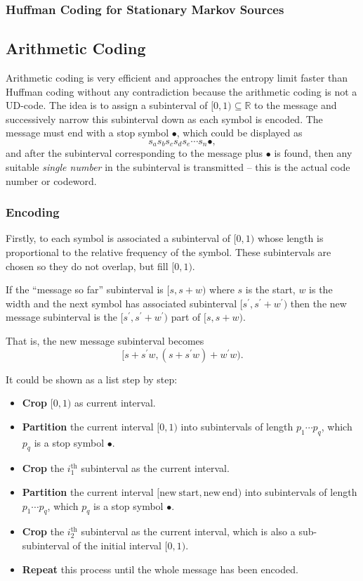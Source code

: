 \documentclass{article}
\begin{document}
\subsubsection{Huffman Coding for Stationary Markov Sources}

\subsection{Arithmetic Coding}

Arithmetic coding is very efficient and approaches the entropy limit faster than Huffman coding without any contradiction because the arithmetic coding is not a UD-code. The idea is to assign a subinterval of $[0, 1) \subseteq \mathbb{R}$ to the message and successively narrow this subinterval down as each symbol is encoded. The message must end with a stop symbol $\bullet$, which could be displayed as 
    \[s_{a}s_{b}s_{c}s_{d}s_{e} \cdots s_{n} \bullet,\]
    and after the subinterval corresponding to the message plus $\bullet$ is found, then any suitable \emph{single number} in the subinterval is transmitted -- this is the actual code number or codeword.

\subsubsection{Encoding}

Firstly, to each symbol is associated a subinterval of $[0, 1)$ whose length is proportional to the relative frequency of the symbol. These subintervals are chosen so they do not overlap, but fill $[0, 1)$.

If the ``message so far'' subinterval is $[s, s+w)$ where $s$ is the start, $w$ is the width and the next symbol has associated subinterval $[s^{\prime}, s^{\prime}+w^{\prime})$ then the new message subinterval is the $[s^{\prime}, s^{\prime}+w^{\prime})$ part of $[s, s+w)$.

That is, the new message subinterval becomes \[[s+s^{\prime}w, (s+s^{\prime}w)+w^{\prime}w).\]

It could be shown as a list step by step:

\begin{itemize}
    \item \textbf{Crop} $[0, 1)$ as current interval.
    \item \textbf{Partition} the current interval $[0, 1)$ into subintervals of length $p_{1} \cdots p_{q}$, which $p_{q}$ is a stop symbol $\bullet$.
    \item \textbf{Crop} the $i_{1}^{\mathrm{th}}$ subinterval as the current interval.
    \item \textbf{Partition} the current interval $[\mathrm{new\ start}, \mathrm{new\ end})$ into subintervals of length $p_{1} \cdots p_{q}$, which $p_{q}$ is a stop symbol $\bullet$.
    \item \textbf{Crop} the $i_{2}^{\mathrm{th}}$ subinterval as the current interval, which is also a sub-subinterval of the initial interval $[0, 1)$.
    \item \textbf{Repeat} this process until the whole message has been encoded.
\end{itemize}
\end{document}
